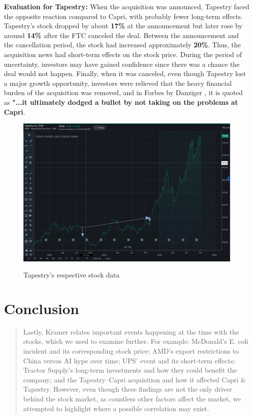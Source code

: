 \documentclass[12pt,a4paper]{article}
\begin{document}
\begin{itemize}
\vspace{1cm}
\textbf{Evaluation for Tapestry:} When the acquisition was announced, Tapestry faced the opposite reaction compared to Capri, with probably fewer long-term effects. Tapestry’s stock dropped by about \textbf{17\%} at the announcement but later rose by around \textbf{14\%} after the FTC canceled the deal.\cite{TPR} Between the announcement and the cancellation period, the stock had increased approximately \textbf{20\%}. Thus, the acquisition news had short-term effects on the stock price. During the period of uncertainty, investors may have gained confidence since there was a chance the deal would not happen. Finally, when it was canceled, even though Tapestry lost a major growth opportunity, investors were relieved that the heavy financial burden of the acquisition was removed, and in Forbes by Danziger , it is quoted as \textbf{"...it ultimately dodged a bullet by not taking on the problems at Capri}.\cite{forbesTapestry}


\begin{figure}[H]
    \centering
    \includegraphics[width=0.85\linewidth]{Tapestry.jpeg}
    \caption{Tapestry's respective stock data}\cite{TPR}
    \label{fig:tapestry}
\end{figure}
\FloatBarrier




\end{itemize}

\vspace{1.1cm}

\section*{Conclusion}

\begin{quote}
Lastly, Kramer relates important events happening at the time with the stocks, which we used to examine further. For example: McDonald’s E. coli incident and its corresponding stock price; AMD’s export restrictions to China versus AI hype over time; UPS' event and its short-term effects; Tractor Supply’s long-term investments and how they could benefit the company; and the Tapestry–Capri acquisition and how it affected Capri \& Tapestry.  However,  even though these findings are not the only driver behind the stock market, as countless other factors affect the market, we attempted to highlight where a possible correlation may exist. 
\end{quote}
\newpage
\end{document}
